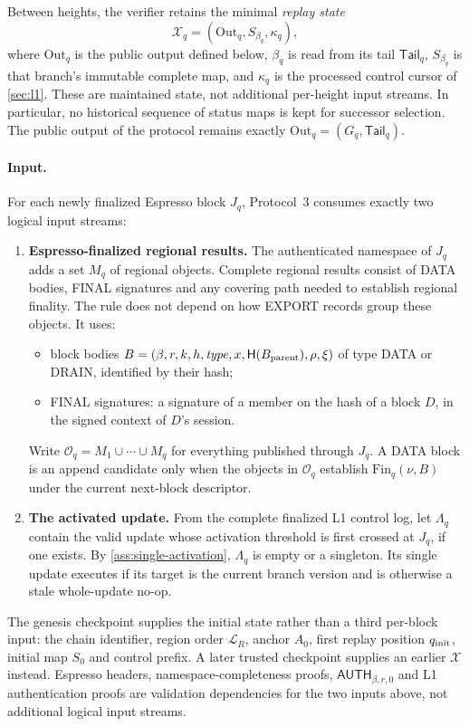 \documentclass[11pt,a4paper]{article}
\newcommand{\Hash}{\mathsf H}
\newcommand{\tagg}[1]{\ensuremath{\mathsf{#1}}}
\newcommand{\defterm}[1]{\textcolor{rrBlue}{\textit{#1}}}
\newcounter{protocol}
\begin{document}
Between heights, the verifier retains the minimal \defterm{replay state}
\[
 \mathcal X_q=(\mathrm{Out}_q,S_{\beta_q},\kappa_q),
\]
where $\mathrm{Out}_q$ is the public output defined below, $\beta_q$
is read from its tail $\mathsf{Tail}_q$, $S_{\beta_q}$ is that branch's
immutable complete map, and $\kappa_q$ is the processed control cursor
of \cref{sec:l1}. These are maintained state, not additional
per-height input streams. In particular, no historical sequence of
status maps is kept for successor selection. The public output of the
protocol remains exactly $\mathrm{Out}_q=(G_q,\mathsf{Tail}_q)$.

\paragraph{Input.}
\label{sec:logical-carrier}
For each newly finalized Espresso block $J_q$, Protocol~3 consumes
exactly two logical input streams:
\begin{enumerate}[label=(I\arabic*),itemsep=2pt]
\item \textbf{Espresso-finalized regional results.}  The authenticated
namespace of $J_q$ adds a set $M_q$ of regional objects.  Complete
regional results consist of DATA bodies, FINAL signatures and any
covering path needed to establish regional finality.  The rule does not
depend on how EXPORT records group these objects.  It uses:
 \begin{itemize}[itemsep=1pt]
 \item block bodies
 $B=(\beta,r,k,h,\mathit{type},x,\Hash(B_{\rm parent}),\rho,\xi)$ of type
 DATA or DRAIN, identified by their hash;
 \item FINAL signatures: a signature of a member on the hash of a block
 $D$, in the signed context of $D$'s session.
 \end{itemize}
Write $\mathcal O_q=M_1\cup\cdots\cup M_q$ for everything published
through $J_q$. A DATA block is an append candidate only when the objects
in $\mathcal O_q$ establish $\mathrm{Fin}_q(\nu,B)$ under the current
next-block descriptor.
\item \textbf{The activated update.} From the complete finalized L1
control log, let $\Lambda_q$ contain the valid update whose activation
threshold is first crossed at $J_q$, if one exists. By
\cref{ass:single-activation}, $\Lambda_q$ is empty or a singleton. Its
single update executes if its target is the current branch version and
is otherwise a stale whole-update no-op.
\end{enumerate}
The genesis checkpoint supplies the initial state rather than a third
per-block input: the chain identifier, region order $\mathcal L_R$,
anchor $A_0$, first replay position $q_{\rm init}$, initial map $S_0$
and control prefix. A later trusted checkpoint supplies an earlier
$\mathcal X$ instead. Espresso headers, namespace-completeness
proofs, $\tagg{AUTH}_{\beta,r,0}$ and L1 authentication proofs are validation
dependencies for the two inputs above, not additional logical input
streams.
\end{document}
